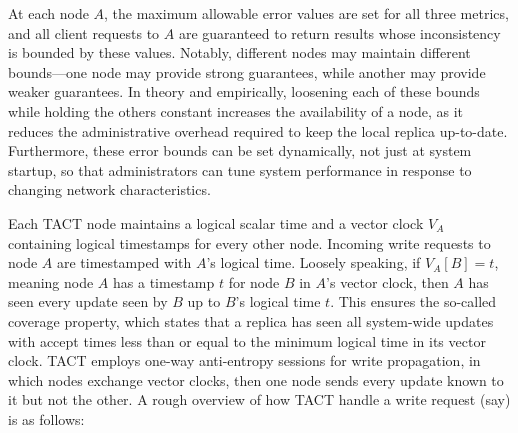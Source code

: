At each node $A$, the maximum allowable error values are set for all three
metrics, and all client requests to $A$ are guaranteed to return results whose
inconsistency is bounded by these values. Notably, different nodes may maintain
different bounds---one node may provide strong guarantees, while another may
provide weaker guarantees. In theory and empirically, loosening each of these
bounds while holding the others constant increases the availability of a node,
as it reduces the administrative overhead required to keep the local replica
up-to-date. Furthermore, these error bounds can be set dynamically, not just at
system startup, so that administrators can tune system performance in response
to changing network characteristics.

Each TACT node maintains a logical scalar time and a vector clock $V_A$
containing logical timestamps for every other node. Incoming write requests to
node $A$ are timestamped with $A$'s logical time. Loosely speaking, if
$V_A[B]=t$, meaning node $A$ has a timestamp $t$ for node $B$ in $A$'s vector
clock, then $A$ has seen every update seen by $B$ up to $B$'s logical time $t$.
This ensures the so-called coverage property, which states that a replica has
seen all system-wide updates with accept times less than or equal to the minimum
logical time in its vector clock. TACT employs one-way anti-entropy sessions for
write propagation, in which nodes exchange vector clocks, then one node sends
every update known to it but not the other. A rough overview of how TACT handle
a write request (say) is as follows:

